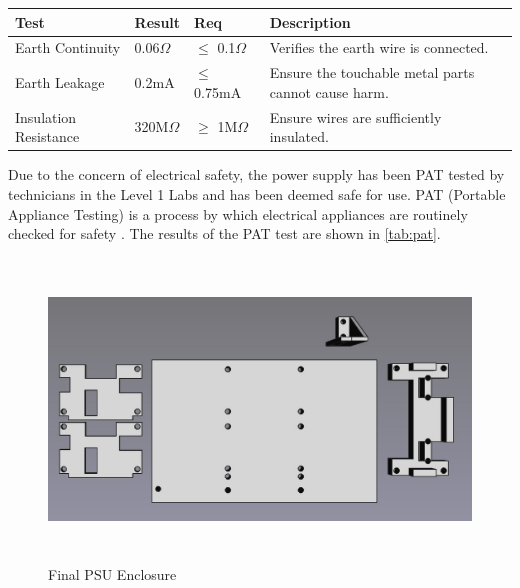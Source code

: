 \begin{minipage}{0.5\textwidth}
    \centering
    {\fontsize{8pt}{11pt}\selectfont
    \begin{tabularx}{\textwidth}{|X|p{1cm}|p{1cm}|X|}
        \hline
        \textbf{Test} & \textbf{Result} & \textbf{Req} & \textbf{Description} \\ \hline
        Earth Continuity & 0.06$\Omega$ & $\leq$ 0.1$\Omega$ & Verifies the earth wire is connected. \\ \hline
        Earth Leakage & 0.2mA & $\leq$ 0.75mA & Ensure the touchable metal parts cannot cause harm. \\ \hline
        Insulation Resistance & 320M$\Omega$ & $\geq$ 1M$\Omega$ & Ensure wires are sufficiently insulated. \\ \hline
    \end{tabularx}
    }
    \label{tab:pat}
\end{minipage}%
\hfill %
\begin{minipage}{0.45\textwidth}
    \centering
    \label{fig:pat}
\end{minipage}


Due to the concern of electrical safety,  the power supply has been PAT tested by technicians in the Level 1 Labs and has been deemed safe for use. PAT (Portable Appliance Testing) is a process by which electrical appliances are routinely checked for safety \cite{patwiki, patspec}. The results of the PAT test are shown in \autoref{tab:pat}.

\begin{figure}[H]
    \begin{minipage}[h]{0.95\textwidth}
        \centering
        \includegraphics[height=8cm]{imgs/freecad/psu_mount.jpg}
        \caption{Final PSU Enclosure}
        \label{fig:psuenclosure}
    \end{minipage}
\end{figure}

